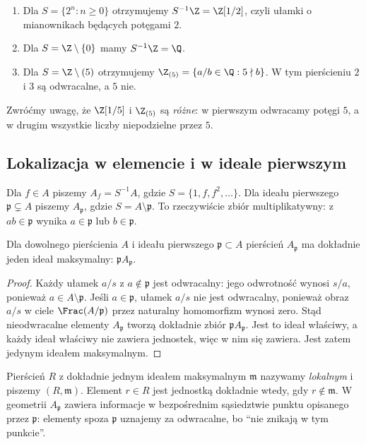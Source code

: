 \begin{przyklad}
\begin{enumerate}[label=\alph*)]
\item Dla $S=\{2^n:n\ge0\}$ otrzymujemy
$S^{-1}\Z=\Z[1/2]$, czyli ułamki o mianownikach
będących potęgami $2$.
\item Dla $S=\Z\setminus\{0\}$ mamy
$S^{-1}\Z=\Q$.
\item Dla $S=\Z\setminus(5)$ otrzymujemy
$\Z_{(5)}=\{a/b\in\Q:5\nmid b\}$.
W tym pierścieniu $2$ i $3$ są odwracalne, a $5$ nie.
\end{enumerate}
Zwróćmy uwagę, że $\Z[1/5]$ i $\Z_{(5)}$ są
\emph{różne}: w pierwszym odwracamy potęgi $5$,
a w drugim wszystkie liczby niepodzielne przez $5$.
\end{przyklad}

\subsection{Lokalizacja w elemencie i w ideale pierwszym}
\begin{definicja}
Dla $f\in A$ piszemy $A_f=S^{-1}A$, gdzie
$S=\{1,f,f^2,\ldots\}$. Dla ideału pierwszego
$\mathfrak p\subsetneq A$ piszemy $A_{\mathfrak p}$,
gdzie $S=A\setminus\mathfrak p$. To rzeczywiście
zbiór multiplikatywny: z $ab\in\mathfrak p$ wynika
$a\in\mathfrak p$ lub $b\in\mathfrak p$.
\end{definicja}

\begin{twierdzenie}
\label{tw:Ap-local}
Dla dowolnego pierścienia $A$ i ideału pierwszego
$\mathfrak p\subset A$ pierścień $A_{\mathfrak p}$
ma dokładnie jeden ideał maksymalny:
$\mathfrak p A_{\mathfrak p}$.
\end{twierdzenie}
\begin{proof}
Każdy ułamek $a/s$ z $a\notin\mathfrak p$ jest
odwracalny: jego odwrotność wynosi $s/a$, ponieważ
$a\in A\setminus\mathfrak p$. Jeśli $a\in\mathfrak p$,
ułamek $a/s$ nie jest odwracalny, ponieważ obraz
$a/s$ w ciele $\Frac(A/\mathfrak p)$ przez
naturalny homomorfizm wynosi zero. Stąd
nieodwracalne elementy $A_{\mathfrak p}$ tworzą
dokładnie zbiór $\mathfrak p A_{\mathfrak p}$.
Jest to ideał właściwy, a każdy ideał właściwy
nie zawiera jednostek, więc w nim się zawiera.
Jest zatem jedynym ideałem maksymalnym.
\end{proof}

\begin{uwaga}
Pierścień $R$ z dokładnie jednym ideałem maksymalnym
$\mathfrak m$ nazywamy \emph{lokalnym} i piszemy
$(R,\mathfrak m)$. Element $r\in R$ jest jednostką
dokładnie wtedy, gdy $r\notin\mathfrak m$.
W geometrii $A_{\mathfrak p}$ zawiera informacje
w bezpośrednim sąsiedztwie punktu opisanego przez
$\mathfrak p$: elementy spoza $\mathfrak p$ uznajemy
za odwracalne, bo ``nie znikają w tym punkcie''.
\end{uwaga}

